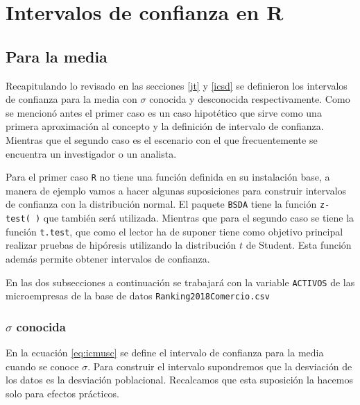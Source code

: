 \documentclass[]{book}
\begin{document}
\newpage

\hypertarget{intervalos-de-confianza-en-r}{%
\section{Intervalos de confianza en R}\label{intervalos-de-confianza-en-r}}

\hypertarget{para-la-media}{%
\subsection{Para la media}\label{para-la-media}}

Recapitulando lo revisado en las secciones \ref{jt} y \ref{icsd} se definieron los intervalos de confianza para la media con \(\sigma\) conocida y desconocida respectivamente. Como se mencionó antes el primer caso es un caso hipotético que sirve como una primera aproximación al concepto y la definición de intervalo de confianza. Mientras que el segundo caso es el escenario con el que frecuentemente se encuentra un investigador o un analista.

Para el primer caso \texttt{R} no tiene una función definida en su instalación base, a manera de ejemplo vamos a hacer algunas suposiciones para construir intervalos de confianza con la distribución normal. El paquete \texttt{BSDA} tiene la función \texttt{z-test(\ )} que también será utilizada. Mientras que para el segundo caso se tiene la función \texttt{t.test}, que como el lector ha de suponer tiene como objetivo principal realizar pruebas de hipóresis utilizando la distribución \(t\) de Student. Esta función además permite obtener intervalos de confianza.

En las dos subsecciones a continuación se trabajará con la variable \texttt{ACTIVOS} de las microempresas de la base de datos \texttt{Ranking2018Comercio.csv}

\hypertarget{musc}{%
\subsubsection{\texorpdfstring{\(\sigma\) conocida}{\textbackslash{}sigma conocida}}\label{musc}}

En la ecuación \eqref{eq:icmusc} se define el intervalo de confianza para la media cuando se conoce \(\sigma\). Para construir el intervalo supondremos que la desviación de los datos es la desviación poblacional. Recalcamos que esta suposición la hacemos solo para efectos prácticos.
\end{document}
